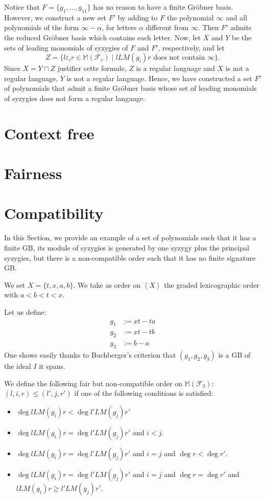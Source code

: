 \documentclass[sigconf]{acmart}
\theoremstyle{plain}
\theoremstyle{definition}
\theoremstyle{remark}
\newcommand{\MM}{\mathbb M}
\newcommand{\LM}{LM}
\newcommand\fixmecc[1]{{\color{red}{\underline{\bf C:}} #1}}
\begin{document}
Notice that $F=\{g_1,\dots,g_{11}\}$ has no reason to have a finite Gröbner basis. However, we construct a new set $F'$ by adding to $F$ the polynomial $\infty$ and all polynomials of the form $\infty-\alpha$, for letters $\alpha$ different from $\infty$. Then $F'$ admits the reduced Gröbner basis which contains each letter.
Now, let $X$ and $Y$ be the sets of leading monomials of syzygies of $F$ and $F'$, respectively, and let 
$$Z=\{l\varepsilon_ir \in \MM(\mathscr{F}_r) \;|\; l \LM(g_i) r \mbox{ does not contain } \infty\}.$$
Since $X=Y\cap Z$ \fixmecc{justifier cette formule}, $Z$ is a regular language and $X$ is not a regular language, $Y$ is not a regular language. Hence, we have constructed a set $F'$ of polynomials that admit a finite Gröbner basis whose set of leading monomials of syzygies does not form a regular language. 


\section{Context free}

\section{Fairness}

\section{Compatibility}

In this Section,
we provide an example
of a set of polynomials
such that 
it has a finite GB,
its module of
syzygies is generated
by one syzygy plus
the principal syzygies,
but there is
a non-compatible order
such that it
has no finite signature GB.

We set $X = \{t, x, a, b \}$.
We take as order on 
$\left\langle X \right\rangle$ the 
graded lexicographic order
with $a < b < t < x$.

Let us define:
\begin{align*}
	g_1 &:= xt - ta \\
	g_2 &:= xt - tb \\
	g_3 &:= b - a
\end{align*}
One shows easily
thanks to Buchberger's criterion
that $(g_1,g_2,g_3)$
is a GB of the ideal $I$ it spans.

We define the following
fair but non-compatible order
on $\MM \left( \mathscr{F}_3 \right):$
  $(l, i, r) \leq (l', j, r')$ if one of the following
  conditions is satisfied:
\begin{itemize}
	\item $\deg{l\LM(g_i)r} < \deg{l'\LM(g_j)r'}$
	\item $\deg{l\LM(g_i)r} = \deg{l'\LM(g_j)r'}$ and $i < j$.
	\item $\deg{l\LM(g_i)r} = \deg{l'\LM(g_j)r'}$ and $i = j$ and $\deg{r} < \deg{r'}$.
	\item $\deg{l\LM(g_i)r} = \deg{l'\LM(g_j)r'}$ and $i = j$ and $\deg{r} = \deg{r'}$ and $l\LM(g_i)r \geq l'\LM(g_j)r'$.
\end{itemize}
\end{document}
